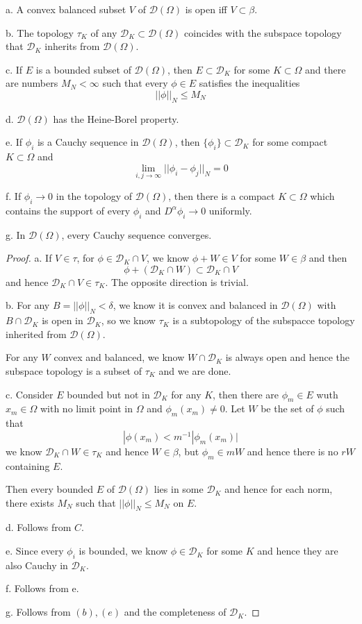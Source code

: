 \documentclass[lang=en, color=blue, ]{elegantbook}
\newcommand{\D}{\mathscr{D}}
\begin{document}
\begin{theorem}
    a. A convex balanced subset $V$ of $\D(\Omega)$ is open iff $V\subset \beta$.\par
    b. The topology $\tau_K$ of any $\D_K \subset \D(\Omega)$ coincides with the subspace topology that $\D_K$ inherits from $\D(\Omega)$.\par
    c. If $E$ is a bounded subset of $\D(\Omega)$, then $E\subset \D_K$ for some $K\subset \Omega$ and there are numbers $M_N < \infty$ such that every $\phi \in E$ satisfies the inequalities
    \[||\phi||_N \leq M_N\]\par
    d. $\D(\Omega)$ has the Heine-Borel property.\par
    e. If $\phi_i$ is a Cauchy sequence in $\D(\Omega)$, then $\{\phi_i\} \subset \D_K$ for some compact $K\subset \Omega$ and
    \[\lim_{i,j\to\infty} ||\phi_i - \phi_j||_N = 0\]\par
    f. If $\phi_i\to 0$ in the topology of $\D(\Omega)$, then there is a compact $K\subset \Omega$ which contains the support of every $\phi_i$ and $D^{\alpha}\phi_i \to 0$ uniformly.\par
    g. In $\D(\Omega)$, every Cauchy sequence converges.
\end{theorem}
\begin{proof}
    a. If $V\in \tau$, for $\phi \in \D_K \cap V$, we know $\phi+W \in V$ for some $W\in\beta$ and then
    \[\phi + (\D_K\cap W) \subset \D_K\cap V\]
    and hence $\D_K \cap V \in \tau_K$. The opposite direction is trivial.\par
    b. For any $B = ||\phi||_N < \delta$, we know it is convex and balanced in $\D(\Omega)$ with $B\cap \D_K$ is open in $\D_K$, so we know $\tau_K$ is a subtopology of the subspacce topology inherited from $\D(\Omega)$.\par
    For any $W$ convex and balanced, we know $W\cap \D_K$ is always open and hence the subspace topology is a subset of $\tau_K$ and we are done.\par
    c. Consider $E$ bounded but not in $\D_K$ for any $K$, then there are $\phi_m \in E$ wuth $x_m \in \Omega$ with no limit point in $\Omega$ and $\phi_m(x_m) \neq 0$. Let $W$ be the set of $\phi$ such that 
    \[|\phi(x_m) < m^{-1}|\phi_m(x_m)|\]
    we know $\D_K \cap W \in \tau_K$ and hence $W\in \beta$, but $\phi_m \in mW$ and hence there is no $rW$ containing $E$.\par
    Then every bounded $E$ of $\D(\Omega)$ lies in some $\D_K$ and hence for each norm, there exists $M_N$ such that $||\phi||_N \leq M_N$ on $E$.\par
    d. Follows from $C$.\par
    e. Since every $\phi_i$ is bounded, we know $\phi\in \D_K$ for some $K$ and hence they are also Cauchy in $\D_K$.\par
    f. Follows from e.\par
    g. Follows from $(b),(e)$ and the completeness of $\D_K$.
\end{proof}
\end{document}

